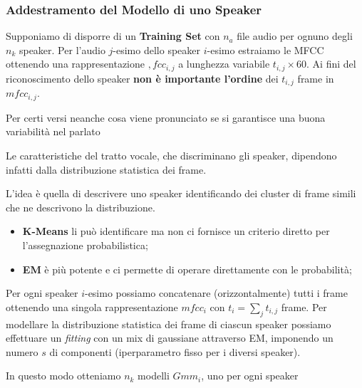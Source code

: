 \documentclass{article}
\begin{document}
\subsubsection{Addestramento del Modello di uno Speaker}\label{sub:em_addestramento_del_modello_di_uno_speaker} %
Supponiamo di disporre di un \textbf{Training Set} con $n_a$ file audio per ognuno degli $n_k$ speaker.
Per l'audio $j$-esimo dello speaker $i$-esimo estraiamo le MFCC ottenendo una rappresentazione $,fcc_{i,j}$ a lunghezza variabile $t_{i,j}\times 60$.
\emptyln{}
Ai fini del riconoscimento dello speaker \textbf{non è importante l'ordine} dei $t_{i,j}$ frame in $mfcc_{i,j}$.
\begin{note}
    Per certi versi neanche cosa viene pronunciato se si garantisce una buona variabilità nel parlato
\end{note}
Le caratteristiche del tratto vocale, che discriminano gli speaker, dipendono infatti dalla distribuzione statistica dei frame.
\begin{note}
    L'idea è quella di descrivere uno speaker identificando dei cluster di frame simili che ne descrivono la distribuzione.
    \begin{itemize}
        \item \textbf{K-Means} li può identificare ma non ci fornisce un criterio diretto per l'assegnazione probabilistica;
        \item \textbf{EM} è più potente e ci permette di operare direttamente con le probabilità;
    \end{itemize}
\end{note}
Per ogni speaker $i$-esimo possiamo concatenare (orizzontalmente) tutti i frame ottenendo una singola rappresentazione $mfcc_{i}$ con $t_i = \sum_jt_{i,j}$ frame.
\emptyln{}
Per modellare la distribuzione statistica dei frame di ciascun speaker possiamo effettuare un \textit{fitting} con un mix di gaussiane attraverso EM, imponendo un numero $s$ di componenti (iperparametro fisso per i diversi speaker).
\begin{note}
    In questo modo otteniamo $n_k$ modelli $Gmm_i$, uno per ogni speaker
\end{note}
%
\end{document}
